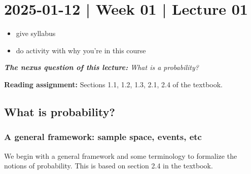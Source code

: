\documentclass[10pt]{article}
\theoremstyle{definition}
\newcommand{\1}[1]{\textbf{1}_{\left[#1\right]}} %
\begin{document}
\newpage
\section{2025-01-12 | Week 01 |  Lecture 01}

\begin{itemize}
  \item give syllabus
  \item do activity with why you're in this course
\end{itemize}


\begin{center}
  \begin{tcolorbox}[width=0.9\textwidth, colback=white, colframe=black]
    \textit{\textbf{The nexus question of this lecture:} What is a
      probability?}
  \end{tcolorbox}
\end{center}
\textbf{Reading assignment:} Sections 1.1, 1.2, 1.3, 2.1, 2.4 of the textbook.

\subsection{What is probability?}
\subsubsection{A general framework: sample space, events, etc}
We begin with a general framework and some terminology to formalize the
notions of probability. This is based on section 2.4 in the textbook.
\end{document}
